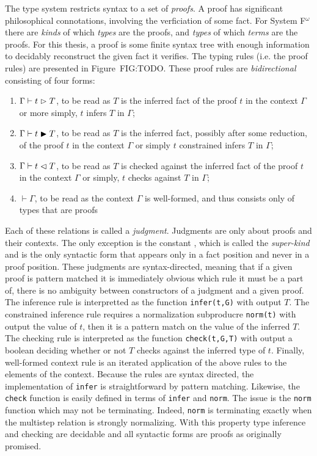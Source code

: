 The type system restricts syntax to a set of \textit{proofs}.
A proof has significant philosophical connotations, involving the verficiation of some fact.
For System F$^\omega$ there are \textit{kinds} of which \textit{types} are the proofs, and \textit{types} of which \textit{terms} are the proofs.
For this thesis, a proof is some finite syntax tree with enough information to decidably reconstruct the given fact it verifies.
The typing rules (i.e. the proof rules) are presented in Figure~FIG:TODO.
These proof rules are \textit{bidirectional} consisting of four forms:
\begin{enumerate}
    \item $\Gamma \vdash t \vartriangleright T$, to be read as $T$ is the inferred fact of the proof $t$ in the context $\Gamma$ or more simply, $t$ infers $T$ in $\Gamma$;
    \item $\Gamma \vdash t \blacktriangleright T$, to be read as $T$ is the inferred fact, possibly after some reduction, of the proof $t$ in the context $\Gamma$ or simply $t$ constrained infers $T$ in $\Gamma$;
    \item $\Gamma \vdash t \vartriangleleft T$, to be read as $T$ is checked against the inferred fact of the proof $t$ in the context $\Gamma$ or simply, $t$ checks against $T$ in $\Gamma$;
    \item $\vdash \Gamma$, to be read as the context $\Gamma$ is well-formed, and thus consists only of types that are proofs
\end{enumerate}
Each of these relations is called a \textit{judgment}.
Judgments are only about proofs and their contexts.
The only exception is the constant \kind, which is called the \textit{super-kind} and is the only syntactic form that appears only in a fact position and never in a proof position.
These judgments are syntax-directed, meaning that if a given proof is pattern matched it is immediately obvious which rule it must be a part of, there is no ambiguity between constructors of a judgment and a given proof.
The inference rule is interpretted as the function \texttt{infer(t,G)} with output $T$.
The constrained inference rule requires a normalization subproducre \texttt{norm(t)} with output the value of $t$, then it is a pattern match on the value of the inferred $T$.
The checking rule is interpreted as the function \texttt{check(t,G,T)} with output a boolean deciding whether or not $T$ checks against the inferred type of $t$.
Finally, well-formed context rule is an iterated application of the above rules to the elements of the context.
Because the rules are syntax directed, the implementation of \texttt{infer} is straightforward by pattern matching.
Likewise, the \texttt{check} function is easily defined in terms of \texttt{infer} and \texttt{norm}.
The issue is the \texttt{norm} function which may not be terminating.
Indeed, \texttt{norm} is terminating exactly when the multistep relation is strongly normalizing.
With this property type inference and checking are decidable and all syntactic forms are proofs as originally promised.

